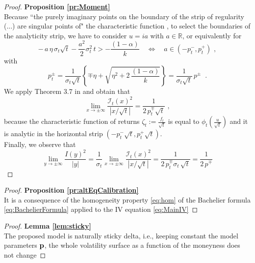 \documentclass[12pt]{article}
\theoremstyle{definition}
\theoremstyle{remark}
\numberwithin{theorem}{section}
\numberwithin{proposition}{section}
\numberwithin{lemma}{section}
\numberwithin{corollary}{section}
\numberwithin{definition}{section}
\numberwithin{remark}{section}
\numberwithin{example}{section}
\newcommand{\R}{\mathbb{R}}
\begin{document}
\smallskip

\begin{proof} {\bf Proposition \ref{pr:Moment}}\\
Because ``the purely imaginary points on the boundary of the strip of
regularity (...) are singular points of" the characteristic function \citep[cf.][Th.3.1, p.12]{lukacs1972}, to select the boundaries of the analyticity strip,
we have to consider $u = i a$ with $a \in \R$, or equivalently for
\[
 - \, a \, \eta\,\sigma_t\sqrt{t} - \frac{ a^2}{2}\sigma_t^2\,t > - \frac{(1-\alpha)}{k}\quad\Leftrightarrow\quad a \in (-p_t^-, p_t^+)\,\,,
\]
with 
\[
p_t^\pm =  \frac{1}{\sigma_t\sqrt{t}}\left\{\mp  \eta + \sqrt{ {\eta}^2 + 2 \,  \frac{(1-\alpha)}{k} }\right\}=\frac{1}{\sigma_t\sqrt{t}}\,p^\pm \;\; .
\]
We apply Theorem 3.7 in \cite{smileWings} and obtain that
\[
\lim_{x\rightarrow\pm\infty}\frac{\mathcal{I}_t(x)^2}{|x/\sqrt{t}|}=\frac{1}{2\,p_t^{\mp}\sqrt{t}}\,\,,
\]
because the characteristic function of returns $\zeta_t:=\frac{f_t}{\sqrt{t}}$ is equal to $\phi_t\left(\frac{u}{\sqrt{t}}\right)$ and it is analytic in the horizontal strip $(-p_t^-\sqrt{t},p_t^+\sqrt{t})$.\\
Finally, we observe that
\[
\lim_{y\rightarrow\pm\infty}\frac{I(y)^2}{|y|}=\frac{1}{\sigma_t}\lim_{x\rightarrow\pm\infty}\frac{\mathcal{I}_t(x)^2}{|x/\sqrt{t}|}=\frac{1}{2\,p_t^\mp\sigma_t\,\sqrt{t}}=\frac{1}{2\,p^\mp}
\]
\end{proof}

\smallskip

\begin{proof}{\bf Proposition \ref{pr:altEqCalibration}}\\
It is a consequence of the homogeneity property \eqref{eq:hom} of the Bachelier formula \eqref{eq:BachelierFormula} applied to
the IV equation \eqref{eq:MainIV}
\end{proof}

\smallskip

\begin{proof}{\bf Lemma \ref{lem:sticky}}\\
The proposed model is naturally sticky delta, i.e., keeping constant the model parameters ${\bf p}$, 
the whole volatility surface as a function of the moneyness does not change
\end{proof}
\newpage


\end{document}
